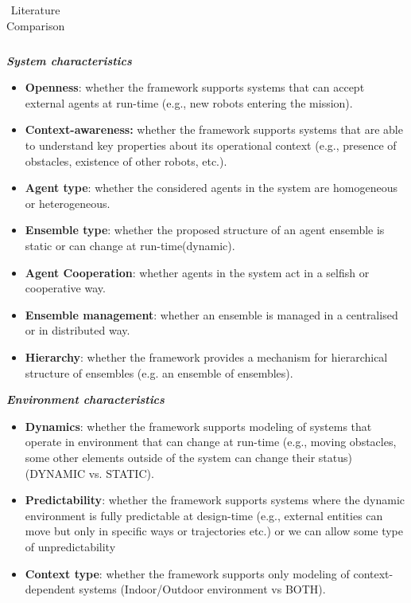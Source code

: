 \documentclass[journal]{IEEEtran}
\theoremstyle{definition}
\begin{document}
\begin{table}[bth]
\begin{tabular}{|c|c|c|c|c|c|c|c|c|c|c|c|c|}
\hline
\end{tabular}
\caption{Literature Comparison}
\label{tab:dliterature}
\end{table}



\textbf{\textit{System characteristics}}

\begin{itemize}
\item \textbf{Openness}: whether the framework supports systems that can accept external agents at run-time (e.g., new robots entering the mission). 
\item \textbf{Context-awareness:} whether the framework supports systems that are able to understand key properties about its operational context (e.g., presence of obstacles, existence of other robots, etc.).
	\item

\textbf{Agent type}: whether the considered agents in the system are homogeneous or heterogeneous. 

\item \textbf{Ensemble type}: whether the proposed structure of an agent ensemble is static or can change at run-time(dynamic). %
	\item \label{lbl:beha}
\textbf{Agent Cooperation}: whether agents in the system act in a selfish or cooperative way.
	\item \label{lbl:confl}
\textbf{Ensemble management}: whether an ensemble is managed in a centralised or in distributed way.
	\item \label{lbl:hierarchy}
\textbf{Hierarchy}: whether the framework provides a mechanism for hierarchical structure of ensembles (e.g. an ensemble of ensembles).
\end{itemize}

\textbf{\textit{Environment characteristics}}
\begin{itemize}
\item \textbf{Dynamics}: whether the framework supports modeling of systems that operate in environment that can change at run-time (e.g., moving obstacles, some other elements outside of the system can change their status) (DYNAMIC vs. STATIC).
\item \textbf{Predictability}: whether the framework supports systems where the dynamic environment is fully predictable at design-time (e.g., external entities can move but only in specific ways or trajectories etc.) or we can allow some type of unpredictability
\item \textbf{Context type}: whether the framework supports only modeling of context-dependent systems (Indoor/Outdoor environment vs BOTH).
\end{itemize}
\end{document}
